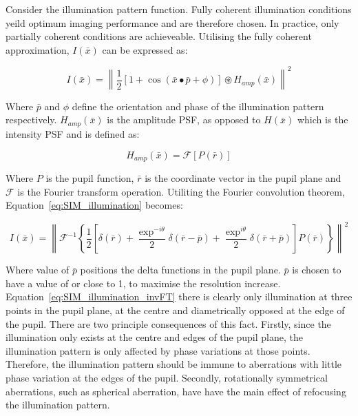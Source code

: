 Consider the illumination pattern function. Fully coherent
illumination conditions yeild optimum imaging performance and
are therefore chosen. In practice, only partially coherent 
conditions are achieveable. Utilising the fully coherent 
approximation, $I(\bar{x})$ can be expressed as:

\begin{equation}\label{eq:SIM_illumination}
	I(\bar{x}) = \left\| \frac{1}{2}[1 + \cos(\bar{x}\bullet\bar{p} + \phi)]\circledast H_{amp}(\bar{x}) \right\|^{2}
\end{equation}

Where $\bar{p}$ and $\phi$ define the orientation and phase of
the illumination pattern respectively. $H_{amp}(\bar{x})$ is the
amplitude PSF, as opposed to $H(\bar{x})$ which is the intensity
PSF and is defined as:

\begin{equation}\label{eq:amplitude_PSF}
	H_{amp}(\bar{x}) = \mathcal{F}[P(\bar{r})]
\end{equation}

Where $P$ is the pupil function, $\bar{r}$ is the coordinate
vector in the pupil plane and $\mathcal{F}$ is the Fourier
transform operation. Utiliting the Fourier convolution 
theorem, Equation~\ref{eq:SIM_illumination} becomes:

\begin{equation}\label{eq:SIM_illumination_invFT}
I(\bar{x}) = \left\| \mathcal{F}^{-1}\left\{\frac{1}{2}\left[\delta(\bar{r}) + \frac{\exp^{-i\theta}}{2}\delta(\bar{r}-\bar{p}) + \frac{\exp^{i\theta}}{2}\delta(\bar{r}+\bar{p})\right]P(\bar{r})\right\} \right\|^{2}
\end{equation}

Where value of $\bar{p}$ positions the delta functions in the
pupil plane. $\bar{p}$ is chosen to have a value of or close
to 1, to maximise the resolution increase. 
Equation~\ref{eq:SIM_illumination_invFT} there is clearly only
illumination at three points in the pupil plane, at the centre 
and diametrically opposed at the edge of the pupil. There are
two principle consequences of this fact. Firstly, since the 
illumination only exists at the centre and edges of the pupil
plane, the illumination pattern is only affected by phase 
variations at those points. Therefore, the illumination pattern
should be immune to aberrations with little phase variation at 
the edges of the pupil. Secondly, rotationally symmetrical 
aberrations, such as spherical aberration, have have the main
effect of refocusing the illumination pattern.\cite{booth2015aberrations}

